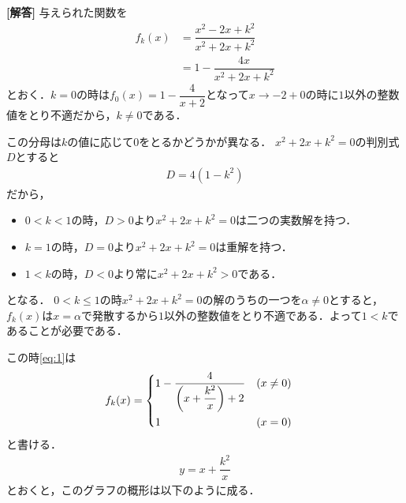 \documentclass[../../main.tex]{subfiles}
\begin{document}
\begin{oframed}
  
\end{oframed}

{\bf [解答]}
与えられた関数を
\begin{align}
  f_{k}(x)
  &=\dfrac{x^2-2x+k^2}{x^2+2x+k^2} \\
  &=1-\dfrac{4x}{x^2+2x+k^2} \label{eq:1}
\end{align}
とおく．$k=0$の時は$f_{0}(x)=1-\dfrac{4}{x+2}$となって$x\to-2+0$の時に$1$以外の整数値をとり不適だから，$k\ne0$である．

この分母は$k$の値に応じて$0$をとるかどうかが異なる．
$x^2 + 2x + k^2=0$の判別式$D$とすると
\begin{align}
  D = 4(1-k^2)
\end{align}
だから，
\begin{itemize}
  \item $0<k<1$の時，$D>0$より$x^2 + 2x + k^2=0$は二つの実数解を持つ．
  \item $k=1$の時，$D=0$より$x^2 + 2x + k^2=0$は重解を持つ．
  \item $1<k$の時，$D<0$より常に$x^2 + 2x + k^2>0$である．
\end{itemize}
となる．
$0<k\le1$の時$x^2 + 2x + k^2=0$の解のうちの一つを$\alpha \neq 0$とすると，$f_k(x)$は$x=\alpha$で発散するから$1$以外の整数値をとり不適である．よって$1<k$であることが必要である．

この時\cref{eq:1}は
\begin{align}
  f_{k}(x) &=
  \begin{dcases}
    1-\dfrac{4}{\left(x+\dfrac{k^2}{x}\right)+2} & \left(x \neq 0\right) \\
    1 & \left(x = 0\right)
  \end{dcases} \label{eq:2}
\end{align}
と書ける．
\begin{align}
  y=x+\dfrac{k^2}{x} \label{eq:3}
\end{align}
とおくと，このグラフの概形は以下のように成る．
\end{document}
